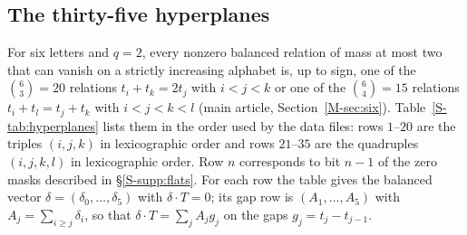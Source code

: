 \documentclass[11pt,reqno]{amsart}
\theoremstyle{plain}
\theoremstyle{definition}
\theoremstyle{plain}
\theoremstyle{plain}
\theoremstyle{plain}
\theoremstyle{plain}
\theoremstyle{plain}
\theoremstyle{plain}
\theoremstyle{definition}
\theoremstyle{definition}
\theoremstyle{definition}
\theoremstyle{plain}
\begin{document}
\subsection{The thirty-five hyperplanes}\label{S-supp:hyperplanes}
For six letters and $q=2$, every nonzero balanced relation of mass at most
two that can vanish on a strictly increasing alphabet is, up to sign, one
of the $\binom63=20$ relations $t_i+t_k=2t_j$ with $i<j<k$ or one of the
$\binom64=15$ relations $t_i+t_l=t_j+t_k$ with $i<j<k<l$ (main article,
Section~\ref{M-sec:six}). Table~\ref{S-tab:hyperplanes} lists them in the order used by the
data files: rows $1$--$20$ are the triples $(i,j,k)$ in lexicographic order
and rows $21$--$35$ are the quadruples $(i,j,k,l)$ in lexicographic order.
Row $n$ corresponds to bit $n-1$ of the zero masks described in
\S\ref{S-supp:flats}. For each row the table gives the balanced vector
$\delta=(\delta_0,\ldots,\delta_5)$ with $\delta\cdot T=0$; its gap row is
$(A_1,\ldots,A_5)$ with $A_j=\sum_{i\ge j}\delta_i$, so that
$\delta\cdot T=\sum_jA_jg_j$ on the gaps $g_j=t_j-t_{j-1}$.
\end{document}
